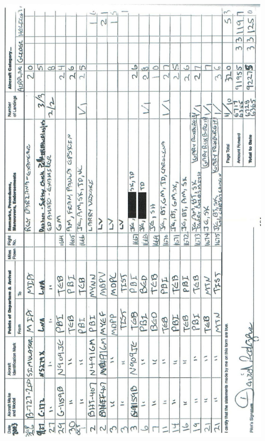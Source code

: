 \documentclass[10pt]{article}
\begin{document}
\includegraphics[max width=\textwidth, center]{2025_02_27_dd68c3d38de88f0516d9g-108}\\
\end{document}
